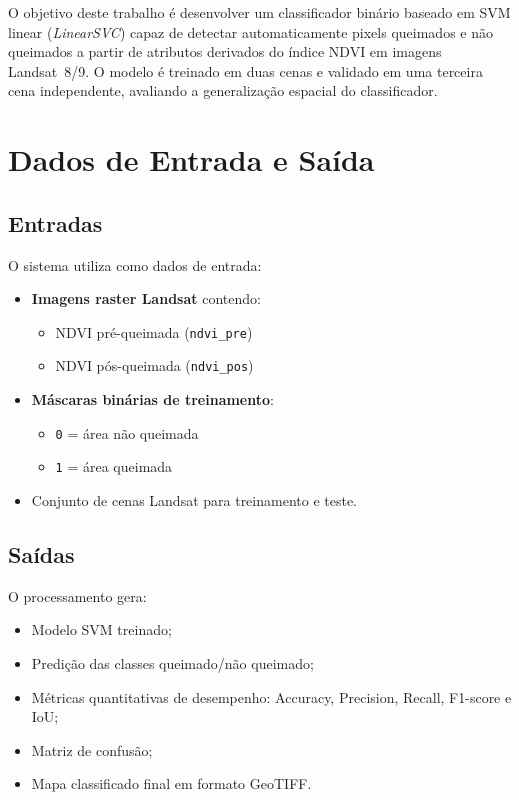 \documentclass[conference]{IEEEtran}
\begin{document}
O objetivo deste trabalho é desenvolver um classificador binário baseado em
SVM linear (\textit{LinearSVC}) capaz de detectar automaticamente pixels
queimados e não queimados a partir de atributos derivados do índice NDVI em
imagens Landsat~8/9. O modelo é treinado em duas cenas e validado em uma
terceira cena independente, avaliando a generalização espacial do classificador.

\section{Dados de Entrada e Saída}

\subsection{Entradas}

O sistema utiliza como dados de entrada:

\begin{itemize}
  \item \textbf{Imagens raster Landsat} contendo:
    \begin{itemize}
      \item NDVI pré-queimada (\texttt{ndvi\_pre})
      \item NDVI pós-queimada (\texttt{ndvi\_pos})
    \end{itemize}
  \item \textbf{Máscaras binárias de treinamento}:
    \begin{itemize}
      \item \texttt{0} = área não queimada
      \item \texttt{1} = área queimada
    \end{itemize}
  \item Conjunto de cenas Landsat para treinamento e teste.
\end{itemize}

\subsection{Saídas}

O processamento gera:

\begin{itemize}
  \item Modelo SVM treinado;
  \item Predição das classes queimado/não queimado;
  \item Métricas quantitativas de desempenho: Accuracy, Precision, Recall,
        F1-score e IoU;
  \item Matriz de confusão;
  \item Mapa classificado final em formato GeoTIFF.
\end{itemize}
\end{document}

